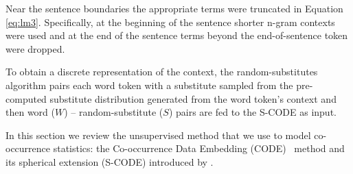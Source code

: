 Near the sentence boundaries the appropriate terms were truncated in
Equation \ref{eq:lm3}.  Specifically, at the beginning of the sentence
shorter n-gram contexts were used and at the end of the sentence terms
beyond the end-of-sentence token were dropped.

To obtain a discrete representation of the context, the
random-substitutes algorithm pairs each word token with a substitute
sampled from the pre-computed substitute distribution generated from
the word token's context and then word ($W$) -- random-substitute
($S$) pairs are fed to the S-CODE as input.

\label{app:codethr}

In this section we review the unsupervised method that we use to model
co-occurrence statistics: the Co-occurrence Data Embedding
(CODE)\ \cite{globerson2007euclidean} method and its spherical
extension (S-CODE) introduced by \cite{maron2010sphere}.

